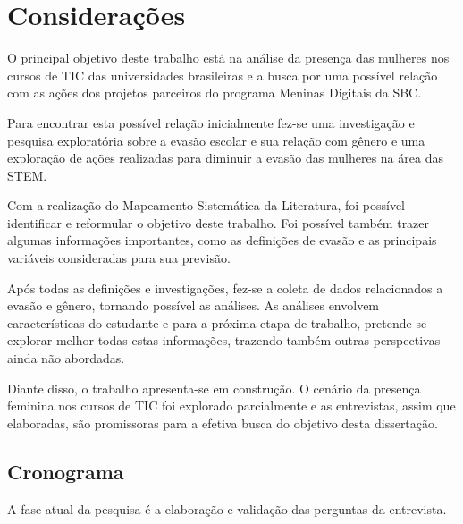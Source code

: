 \chapter{Considerações}\label{cap:Consideracoes}
O principal objetivo deste trabalho está na análise da presença das mulheres nos cursos de TIC das universidades brasileiras e a busca por uma possível relação com as ações dos projetos parceiros do programa Meninas Digitais da SBC. 

Para encontrar esta possível relação inicialmente fez-se uma investigação e pesquisa exploratória sobre a evasão escolar e sua relação com gênero e uma exploração de ações realizadas para diminuir a evasão das mulheres na área das STEM.

Com a realização do Mapeamento Sistemática da Literatura, foi possível identificar e reformular o objetivo deste trabalho. Foi possível também trazer algumas informações importantes, como as definições de evasão e as principais variáveis consideradas para sua previsão.

Após todas as definições e investigações, fez-se a coleta de dados relacionados a evasão e gênero, tornando possível as análises. As análises envolvem características do estudante e para a próxima etapa de trabalho, pretende-se explorar melhor todas estas informações, trazendo também outras perspectivas ainda não abordadas.

Diante disso, o trabalho apresenta-se em construção. O cenário da presença feminina nos cursos de TIC foi explorado parcialmente e as entrevistas, assim que elaboradas, são promissoras para a efetiva busca do objetivo desta dissertação.


\section{Cronograma}\label{sec:Cronograma}
A fase atual da pesquisa é a elaboração e validação das perguntas da entrevista.

